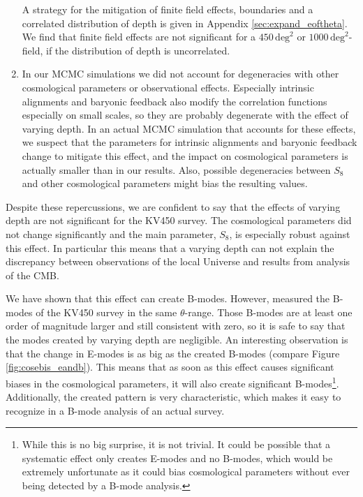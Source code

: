 \documentclass[referee]{aa} %
\renewcommand{\[}{\begin{equation}}
\renewcommand{\]}{\end{equation}}
\renewcommand{\rm}{\mathrm}
\begin{document}
\begin{enumerate}
A strategy for the mitigation of finite field effects, boundaries and a correlated distribution of depth is given in Appendix \ref{sec:expand_eoftheta}. We find that finite field effects are not significant for a $450\,\rm{deg}^2$ or $1000\,\rm{deg}^2$-field, if the distribution of depth is uncorrelated.

\item In our MCMC simulations we did not account for degeneracies with other cosmological parameters
 or observational effects. Especially intrinsic alignments and baryonic feedback also modify the correlation functions especially on small scales, so they are probably degenerate with the effect of varying depth. In an actual MCMC simulation that accounts for these effects, we suspect that the parameters for intrinsic alignments and baryonic feedback change to mitigate this effect, and the impact on cosmological parameters is actually smaller than in our results. Also, possible degeneracies between $S_8$ and other cosmological parameters might bias the resulting values. %
\end{enumerate}

Despite these repercussions, we are confident to say that the effects of varying depth are not significant for the KV450 survey. The cosmological parameters did not change significantly and the main parameter, $S_8$, is especially robust against this effect. In particular this means that a varying depth can not explain the discrepancy between observations of the local Universe and results from analysis of the CMB.

We have shown that this effect can create B-modes. However, \citet{2018arXiv181002353A} measured the B-modes of the KV450 survey in the same $\theta$-range. Those B-modes are at least one order of magnitude larger and still consistent with zero, so it is safe to say that the modes created by varying depth are negligible. An interesting observation is that the change in E-modes is as big as the created B-modes (compare Figure \ref{fig:cosebis_eandb}). This means that as soon as this effect causes significant biases in the cosmological parameters, it will also create significant B-modes\footnote{While this is no big surprise, it is not trivial. It could be possible that a systematic effect only creates E-modes and no B-modes, which would be extremely unfortunate as it could bias cosmological parameters without ever being detected by a B-mode analysis.}. Additionally, the created pattern is very characteristic, which makes it easy to recognize in a B-mode analysis of an actual survey.
\end{document}
